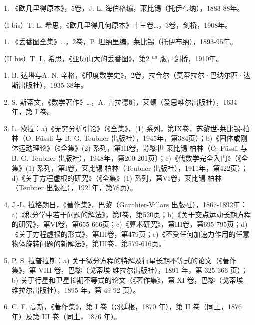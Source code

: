 
\begin{enumerate}
\def\labelenumi{(\Roman{enumi})}
\tightlist
\item
  《欧几里得原本》，5卷，J. L. 海伯格编，莱比锡（托伊布纳），1883-88年。
\end{enumerate}

（I bis）T. L. 希思，《欧几里得几何原本》十三卷\ldots，3卷，剑桥，1908年。

\begin{enumerate}
\def\labelenumi{(\Roman{enumi})}
\setcounter{enumi}{1}
\tightlist
\item
  《丢番图全集》\ldots，2卷，P. 坦纳里编，莱比锡（托伊布纳），1893-95年。
\end{enumerate}

（II bis）T. L. 希思，《亚历山大的丢番图》，第2 \(^{nd}\) 版，剑桥，1910年。

\begin{enumerate}
\def\labelenumi{(\Roman{enumi})}
\setcounter{enumi}{2}
\item
  B. 达塔与A. N. 辛格，《印度数学史》，2卷，拉合尔（莫蒂拉尔·巴纳尔西·达斯出版社），1935-38年。
\item
  S. 斯蒂文，《数学著作》\ldots，A. 吉拉德编，莱顿（爱思唯尔出版社），1634 年，第 I 卷。
\item
  L. 欧拉：a)《无穷分析引论》（《全集》，(1) 系列，第IX卷，苏黎世-莱比锡-柏林（O. Füssli 与 B. G. Teubner 出版社），1945年，第384页）；b)《固体或刚体运动理论》（《全集》(2) 系列，第III卷，苏黎世-莱比锡-柏林（O. Füssli 与 B. G. Teubner 出版社），1948年，第200-201页）；c)《代数学完全入门》（《全集》(1) 系列，第I卷，莱比锡-柏林（Teubner 出版社），1911年，第422页）；d)《关于方程虚根的研究》（《全集》(1) 系列，第VI卷，莱比锡-柏林（Teubner 出版社），1921年，第78页）。
\item
  J.-L. 拉格朗日，《著作集》，巴黎（Gauthier-Villars 出版社），1867-1892年：a)《积分学中若干问题的解法》，第I卷，第520页；b)《关于交点运动长期方程的研究》，第VI卷，第655-666页；c)《算术研究》，第III卷，第695-795页；d)《关于方程虚根的形式》，第III卷，第479页；e)《不受任何加速力作用的任意物体旋转问题的新解法》，第III卷，第579-616页。
\item
  P. S. 拉普拉斯：a) 关于微分方程的特解及行星长期不等式的论文（《著作集》，第 VIII 卷，巴黎（戈蒂埃-维拉尔出版社），1891 年，第 325-366 页）；b) 关于行星和卫星长期不等式的论文（《著作集》，第 XI 卷，巴黎（戈蒂埃-维拉尔出版社），1895 年，第 49-92 页）。
\item
  C. F. 高斯，《著作集》，第 I 卷（哥廷根，1870 年），第 II 卷（同上，1876 年）及第 III 卷（同上，1876 年）。
\end{enumerate}

